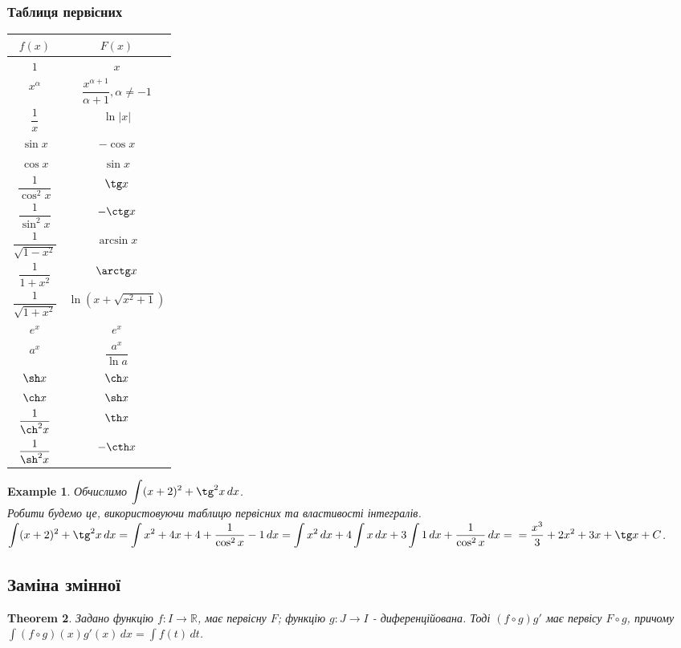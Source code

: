 \documentclass[a4paper, 10pt]{article}
\def\huge{\displaystyle}
\theoremstyle{theoremdd}
\newtheorem{theorem}{Theorem}[subsection]
\theoremstyle{theoremdd}
\theoremstyle{theoremdd}
\theoremstyle{theoremdd}
\newtheorem{example}[theorem]{Example}
\theoremstyle{theoremdd}
\theoremstyle{theoremdd}
\theoremstyle{theoremdd}
\theoremstyle{theoremdd}
\begin{document}
\subsubsection*{Таблиця первісних}
\begin{center}
\begin{tabular}{ c|c } 
 $f(x)$ & $F(x)$ \\
 \hline 
 $1$ & $x$ \\ [2ex]
 \hline 
 $x^\alpha$ & $\dfrac{x^{\alpha+1}}{\alpha+1}, \alpha \neq -1$ \\ [2ex]
 \hline
 $\dfrac{1}{x}$ & $\ln |x|$ \\ [2ex]
 \hline
 $\sin x$ & $-\cos x$\\ [2ex]
 \hline 
 $\cos x$ & $\sin x$\\ [2ex]
 \hline
 $\dfrac{1}{\cos^2 x}$ & $\tg x$\\ [2ex]
 \hline 
 $\dfrac{1}{\sin^2 x}$ & $-\ctg x$\\ [2ex]
 \hline
 $\dfrac{1}{\sqrt{1-x^2}}$ & $\arcsin x$\\ [2ex]
 \hline
 $\dfrac{1}{1+x^2}$ & $\arctg x$\\ [2ex]
 \hline
 $\dfrac{1}{\sqrt{1+x^2}}$ & $\ln(x+\sqrt{x^2+1})$\\ [2ex]
 \hline
 $e^x$ & $e^x$ \\ [2ex]
 \hline 
 $a^x$ & $\dfrac{a^x}{\ln a}$ \\ [2ex]
 \hline
 $\sh x$ & $\ch x$ \\ [2ex]
 \hline
 $\ch x$ & $\sh x$ \\ [2ex]
 \hline
 $\dfrac{1}{\ch^2 x}$ & $\th x$\\ [2ex]
 \hline
 $\dfrac{1}{\sh^2 x}$ & $-\cth x$\\
\end{tabular}
\end{center}

\begin{example}
Обчислимо $\huge\int (x+2)^2 + \tg^2 x\,dx$.\\
Робити будемо це, використовуючи таблицю первісних та властивості інтегралів.\\
$\huge\int (x+2)^2 + \tg^2 x\,dx = \int x^2 + 4x + 4 + \dfrac{1}{\cos^2 x} - 1\,dx = \int x^2\,dx + 4 \int x\,dx + 3 \int 1\,dx + \dfrac{1}{\cos^2 x}\,dx = \\ = \dfrac{x^3}{3} + 2x^2 + 3x + \tg x + C$.
\end{example}

\subsection{Заміна змінної}
\begin{theorem} Задано функцію $f: I \to \mathbb{R}$, має первісну $F$; функцію $g: J \to I$ - диференційована. Тоді $(f \circ g) g'$ має первісу $F \circ g$, причому \\
$\huge \int (f \circ g)(x) g'(x)\,dx = \int f(t)\,dt$.
\end{theorem}
\end{document}
